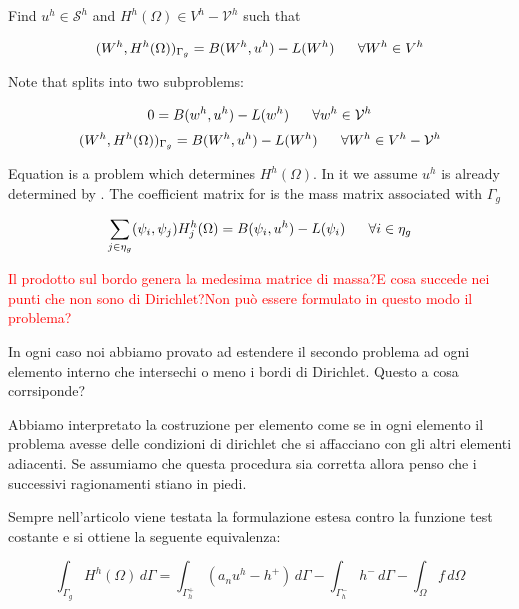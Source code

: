 Find $u^h\in \mathcal{S}^h$ and $H^h(\Omega)\in V^h - \mathcal{V}^h$ such that

\begin{equation}
\label{eq: extended weak formulation}
(W^h,H^h(\Omega))_{\Gamma_g}=B(W^h,u^h)-L(W^h) \psp{10} \forall W^h\in V^h
\end{equation}

Note that  splits into two subproblems:

\begin{equation}
\label{eq: usally problem}
0=B(w^h,u^h)-L(w^h) \psp{10} \forall w^h\in \mathcal{V}^h
\end{equation}
\begin{equation}
\label{eq: problem auxiliary flux}
(W^h,H^h(\Omega))_{\Gamma_g}=B(W^h,u^h)-L(W^h) \psp{10} \forall W^h\in V^h-\mathcal{V}^h
\end{equation}

Equation  is a problem which determines $H^h(\Omega)$. In it we assume $u^h$ is already determined by .
The coefficient matrix for  is the mass matrix associated with $\Gamma_g$

\begin{equation}
\sum_{j\in \eta_g} (\psi_i,\psi_j)H^h_j(\Omega) = B(\psi_i,u^h)-L(\psi_i) \psp{10} \forall i \in \eta_g
\end{equation}

\textcolor{red}{Il prodotto sul bordo genera la medesima matrice di massa?E cosa succede nei punti che non sono di Dirichlet?Non può essere formulato in questo modo il problema?}

In ogni caso noi abbiamo provato ad estendere il secondo problema ad ogni elemento interno che intersechi o meno i bordi di Dirichlet.
Questo a cosa corrsiponde?

Abbiamo interpretato la costruzione per elemento come se in ogni elemento il problema avesse delle condizioni di dirichlet che si affacciano con gli altri elementi adiacenti.
Se assumiamo che questa procedura sia corretta allora penso che i successivi ragionamenti stiano in piedi.

Sempre nell'articolo viene testata la formulazione estesa contro la funzione test costante e si ottiene la seguente equivalenza:

\begin{equation}
\int_{\Gamma_g}H^h(\Omega) \, d\Gamma = \int_{\Gamma^+_h}(a_nu^h-h^+) \, d\Gamma - \int_{\Gamma_h^-}h^- \, d\Gamma - \int_\Omega f \, d\Omega
\end{equation}

